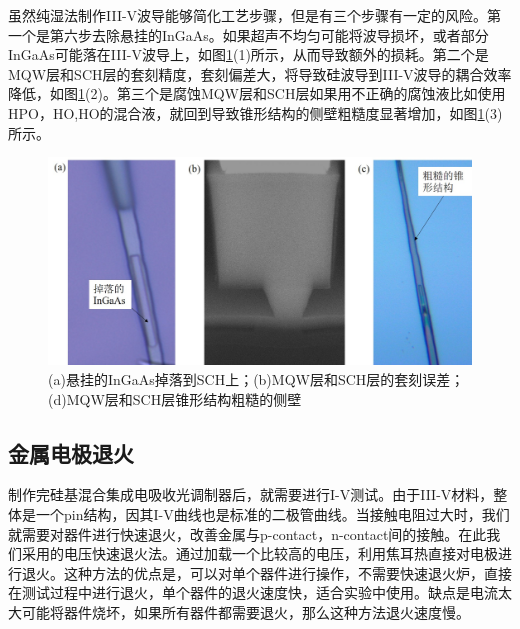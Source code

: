 虽然纯湿法制作III-V波导能够简化工艺步骤，但是有三个步骤有一定的风险。第一个是第六步去除悬挂的InGaAs。如果超声不均匀可能将波导损坏，或者部分InGaAs可能落在III-V波导上，如图\ref{chapt4_III_V_wrong_results}(1)所示，从而导致额外的损耗。第二个是MQW层和SCH层的套刻精度，套刻偏差大，将导致硅波导到III-V波导的耦合效率降低，如图\ref{chapt4_III_V_wrong_results}(2)。第三个是腐蚀MQW层和SCH层如果用不正确的腐蚀液比如使用HPO，HO,HO的混合液，就回到导致锥形结构的侧壁粗糙度显著增加，如图\ref{chapt4_III_V_wrong_results}(3)所示。
\begin{figure}[htb]
	\centering
	\includegraphics[width=14cm]{./Pictures/chapt4_III_V_wrong_results.jpg}
	\caption{(a)悬挂的InGaAs掉落到SCH上；(b)MQW层和SCH层的套刻误差；(d)MQW层和SCH层锥形结构粗糙的侧壁}
	\label{chapt4_III_V_wrong_results}
\end{figure}

\subsection{金属电极退火}
制作完硅基混合集成电吸收光调制器后，就需要进行I-V测试。由于III-V材料，整体是一个pin结构，因其I-V曲线也是标准的二极管曲线。当接触电阻过大时，我们就需要对器件进行快速退火，改善金属与p-contact，n-contact间的接触。在此我们采用的电压快速退火法。通过加载一个比较高的电压，利用焦耳热直接对电极进行退火。这种方法的优点是，可以对单个器件进行操作，不需要快速退火炉，直接在测试过程中进行退火，单个器件的退火速度快，适合实验中使用。缺点是电流太大可能将器件烧坏，如果所有器件都需要退火，那么这种方法退火速度慢。


